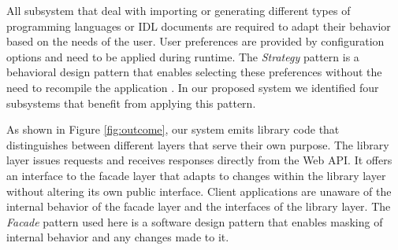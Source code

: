 All subsystem that deal with importing or generating different types of programming languages or IDL documents are required to adapt their behavior based on the needs of the user. User preferences are provided by configuration options and need to be applied during runtime. The \textit{Strategy} pattern \cite{gamma_design_1995} is a behavioral design pattern that enables selecting these preferences without the need to recompile the application \cite{bruegge_object-oriented_2010}. In our proposed system we identified four subsystems that benefit from applying this pattern.

As shown in Figure \ref{fig:outcome}, our system emits library code that distinguishes between different layers that serve their own purpose. The library layer issues requests and receives responses directly from the Web API. It offers an interface to the facade layer that adapts to changes within the library layer without altering its own public interface. Client applications are unaware of the internal behavior of the facade layer and the interfaces of the library layer. The \textit{Facade} pattern \cite{gamma_design_1995} used here is a software design pattern that enables masking of internal behavior and any changes made to it.
 